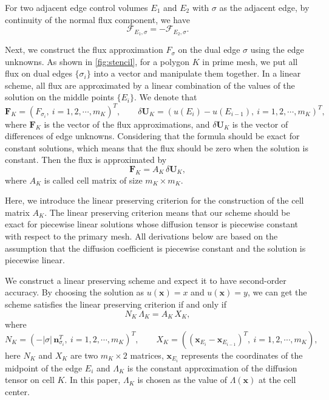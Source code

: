 \documentclass[times,review,preprint,authoryear]{elsarticle}
\newcommand{\bx}{\bm{x}}
\newcommand{\bn}{\bm{n}}
\begin{document}
For two adjacent edge control volumes $E_1$ and $E_2$ with $\sigma$ as the adjacent edge, by continuity of the normal flux component, we have
\begin{equation*}
\mathcal{F}_{E_1, \sigma} = - \mathcal{F}_{E_2, \sigma}.
\end{equation*}

Next, we construct the flux approximation $F_{\sigma}$ on the dual edge $\sigma$ using the edge unknowns.
As shown in \cref{fig:stencil}, for a polygon $K$ in prime mesh, we put all flux on dual edges $\{\sigma_{i}\}$ into a vector and manipulate them together. In a linear scheme, all flux are approximated by a linear combination of the values of the solution on the middle points $\{E_{i}\}$. We denote that
\begin{equation}\label{eq:deffu}
\mathbf{F}_K = (F_{\sigma_{i}}, \ i = 1,2,\cdots,m_K)^T, \qquad \delta \mathbf{U}_K = (u(E_{i}) - u(E_{i-1}), \ i = 1,2,\cdots,m_K)^T,
\end{equation}
where $\mathbf{F}_K$ is the vector of the flux approximations, and $\delta \mathbf{U}_K$ is the vector of differences of edge unknowns.
Considering that the formula should be exact for constant solutions, which means that the flux should be zero when the solution is constant. Then the flux is approximated by
\begin{equation}\label{eq:fluxapp}
\mathbf{F}_K = A_K \, \delta \mathbf{U}_K,
\end{equation}
where $A_K$ is called cell matrix of size $m_K \times m_K$.

Here, we introduce the linear preserving criterion for the construction of the cell matrix $A_K$. The linear preserving criterion means that our scheme should be exact for piecewise linear solutions whose diffusion tensor is piecewise constant with respect to the primary mesh. All derivations below are based on the assumption that the diffusion coefficient is piecewise constant and the solution is piecewise linear.

We construct a linear preserving scheme and expect it to have second-order accuracy. By choosing the solution as $u(\bx) = x$ and $u(\bx) = y$, we can get the scheme satisfies the linear preserving criterion if and only if
\begin{equation}\label{eq:lpmat}
N_K \, \Lambda_K = A_K \, X_K,
\end{equation}
where
\begin{equation}\label{eq:defnx}
N_K = (- |\sigma| \, \bn_{\sigma_{i}}^T, \ i = 1,2,\cdots,m_K)^T, \qquad X_K = ((\bx_{E_{i}} - \bx_{E_{i-1}})^T, \ i = 1,2,\cdots,m_K),
\end{equation}
here $N_K$ and $X_K$ are two $m_K \times 2$ matrices, $\bx_{E_i}$ represents the coordinates of the midpoint of the edge $E_i$ and $\Lambda_K$ is the constant approximation of the diffusion tensor on cell $K$. In this paper, $\Lambda_K$ is chosen as the value of $\Lambda(\bx)$ at the cell center.
\end{document}
